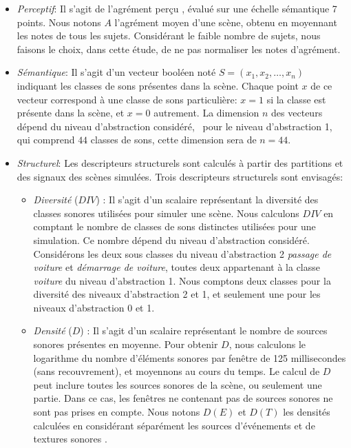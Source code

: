 \begin{itemize}
\item \emph{Perceptif}: Il s'agit de l'agrément perçu  , évalué sur une échelle sémantique 7 points. Nous notons $A$ l'agrément moyen d'une scène, obtenu en moyennant les notes de tous les sujets. Considérant le faible nombre de sujets, nous faisons le choix, dans cette étude, de ne pas normaliser les notes d'agrément.
\item \emph{Sémantique}: Il s'agit d'un vecteur booléen noté $S=(x_1,x_2,\ldots,x_n)$ indiquant les classes de sons présentes dans la scène. Chaque point $x$ de ce vecteur correspond à une classe de sons particulière: $x=1$ si la classe est présente dans la scène, et $x=0$ autrement. La dimension $n$ des vecteurs dépend du niveau d'abstraction considéré, \eg~pour le niveau d'abstraction 1, qui comprend $44$ classes de sons, cette dimension sera de $n=44$.
\item \emph{Structurel}: Les descripteurs structurels sont calculés à partir des partitions et des signaux des scènes simulées. Trois descripteurs structurels sont envisagés:
\begin{itemize}
\item \emph{Diversité} ($DIV$) : Il s'agit d'un scalaire représentant la diversité des classes sonores utilisées pour simuler une scène. Nous calculons $DIV$ en comptant le nombre de classes de sons distinctes utilisées pour une simulation. Ce nombre dépend du niveau d'abstraction considéré. Considérons les deux sous classes du niveau d'abstraction 2 \emph{passage de voiture} et \emph{démarrage de voiture}, toutes deux appartenant à la classe \emph{voiture} du niveau d'abstraction 1. Nous comptons deux classes pour la diversité des niveaux d'abstraction 2 et 1, et seulement une pour les niveaux d'abstraction 0 et 1.
\item \emph{Densité} ($D$) : Il s'agit d'un scalaire représentant le nombre de sources sonores présentes en moyenne. Pour obtenir $D$, nous calculons le logarithme du nombre d'éléments sonores par fenêtre de 125 millisecondes (sans recouvrement), et moyennons au cours du temps. Le calcul de $D$ peut inclure toutes les sources sonores de la scène, ou seulement une partie. Dans ce cas, les fenêtres ne contenant pas de sources sonores ne sont pas prises en compte. Nous notons $D(E)$ et $D(T)$ les densités calculées en considérant séparément les sources d'événements et de textures sonores .

\end{itemize}
\end{itemize}
